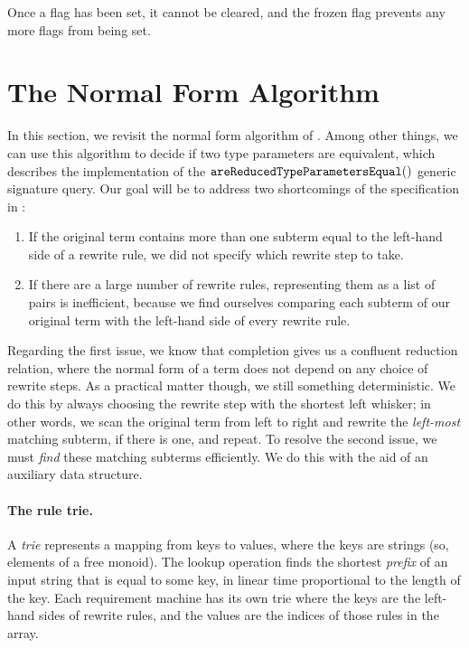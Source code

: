 \documentclass[../generics]{subfiles}
\begin{document}
Once a flag has been set, it cannot be cleared, and the frozen flag prevents any more flags from being set.

\section{The Normal Form Algorithm}\label{term reduction}

In this section, we revisit the normal form algorithm of . Among other things, we can use this algorithm to decide if two type parameters are equivalent, which describes the implementation of the $\texttt{areReducedTypeParametersEqual}()$ generic signature query. Our goal will be to address two shortcomings of the specification in :
\begin{enumerate}
\item If the original term contains more than one subterm equal to the left-hand side of a rewrite rule, we did not specify which rewrite step to take.

\item If there are a large number of rewrite rules, representing them as a list of pairs is inefficient, because we find ourselves comparing each subterm of our original term with the left-hand side of every rewrite rule.
\end{enumerate}
Regarding the first issue, we know that completion gives us a confluent reduction relation, where the normal form of a term does not depend on any choice of rewrite steps. As a practical matter though, we still something deterministic. We do this by always choosing the rewrite step with the shortest left whisker; in other words, we scan the original term from left to right and rewrite the \emph{left-most} matching subterm, if there is one, and repeat. To resolve the second issue, we must \emph{find} these matching subterms efficiently. We do this with the aid of an auxiliary data structure.

\newcommand{\TKey}[1]{\texttt{KEY}(#1)}
\newcommand{\TChild}[2]{\texttt{CHILD}(#1,#2)}
\newcommand{\TValue}[1]{\texttt{VALUE}(#1)}

\paragraph{The rule trie.} A \emph{trie} represents a mapping from keys to values, where the keys are strings (so, elements of a free monoid). The lookup operation finds the shortest \emph{prefix} of an input string that is equal to some key, in linear time proportional to the length of the key. Each requirement machine has its own trie where the keys are the left-hand sides of rewrite rules, and the values are the indices of those rules in the array.
\end{document}
